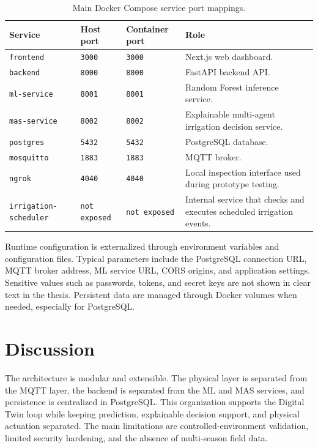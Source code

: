 \begin{table}[H]
\centering
\caption{Main Docker Compose service port mappings.}
\label{tab:docker_compose_ports}
\small
\begin{tabular}{p{}p{}p{}p{}}
\hline
\textbf{Service} & \textbf{Host port} & \textbf{Container port} & \textbf{Role} \\
\hline
\texttt{frontend} & \texttt{3000} & \texttt{3000} & Next.js web dashboard. \\
\texttt{backend} & \texttt{8000} & \texttt{8000} & FastAPI backend API. \\
\texttt{ml-service} & \texttt{8001} & \texttt{8001} & Random Forest inference service. \\
\texttt{mas-service} & \texttt{8002} & \texttt{8002} & Explainable multi-agent irrigation decision service. \\
\texttt{postgres} & \texttt{5432} & \texttt{5432} & PostgreSQL database. \\
\texttt{mosquitto} & \texttt{1883} & \texttt{1883} & MQTT broker. \\
\texttt{ngrok} & \texttt{4040} & \texttt{4040} & Local inspection interface used during prototype testing. \\
\texttt{irrigation-scheduler} & \texttt{not exposed} & \texttt{not exposed} & Internal service that checks and executes scheduled irrigation events. \\
\hline
\end{tabular}
\end{table}

Runtime configuration is externalized through environment variables and configuration files. Typical parameters include the PostgreSQL connection URL, MQTT broker address, ML service URL, CORS origins, and application settings. Sensitive values such as passwords, tokens, and secret keys are not shown in clear text in the thesis. Persistent data are managed through Docker volumes when needed, especially for PostgreSQL.

\section{Discussion}

The architecture is modular and extensible. The physical layer is separated from the MQTT layer, the backend is separated from the ML and MAS services, and persistence is centralized in PostgreSQL. This organization supports the Digital Twin loop while keeping prediction, explainable decision support, and physical actuation separated. The main limitations are controlled-environment validation, limited security hardening, and the absence of multi-season field data.

